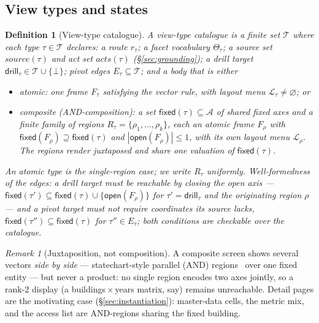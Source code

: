 \documentclass[11pt,a4paper]{article}
\newtheorem{definition}{Definition}[section]
\theoremstyle{remark}
\newtheorem{remark}{Remark}[section]
\newcommand{\Ax}{\mathcal{A}}                    %
\newcommand{\open}{\mathsf{open}}
\newcommand{\fixed}{\mathsf{fixed}}
\newcommand{\vdrill}{\mathsf{drill}}
\newcommand{\TT}{\mathcal{T}}                    %
\newcommand{\LL}{\mathcal{L}}
\newcommand{\src}{\mathit{source}}
\newcommand{\acts}{\mathit{acts}}
\begin{document}
\subsection{View types and states}

\begin{definition}[View-type catalogue]\label{def:catalogue}
A \emph{view-type catalogue} is a finite set $\TT$ where each type $\tau \in \TT$
declares: a route $r_\tau$; a facet vocabulary $\Theta_\tau$; a source set
$\src(\tau)$ and act set $\acts(\tau)$ (\S\ref{sec:grounding}); a drill target
$\vdrill_\tau \in \TT \cup \{\bot\}$; pivot edges $E_\tau \subseteq \TT$; and a
body that is either
\begin{itemize}
\item \emph{atomic}: one frame $F_\tau$ satisfying the vector rule, with layout
  menu $\LL_\tau \neq \varnothing$; or
\item \emph{composite} (AND-composition): a set $\fixed(\tau) \subseteq \Ax$ of
  shared fixed axes and a finite family of \emph{regions}
  $R_\tau = \{\rho_1, \ldots, \rho_k\}$, each an atomic frame $F_\rho$ with
  $\fixed(F_\rho) \supseteq \fixed(\tau)$ and $|\open(F_\rho)| \le 1$, with its
  own layout menu $\LL_\rho$. The regions render \emph{juxtaposed} and share one
  valuation of $\fixed(\tau)$.
\end{itemize}
An atomic type is the single-region case; we write $R_\tau$ uniformly.
Well-formedness of the edges: a drill target must be reachable by closing the
open axis --- $\fixed(\tau') \subseteq \fixed(\tau) \cup \{\open(F_\rho)\}$
for $\tau' = \vdrill_\tau$ and the originating region $\rho$ --- and a pivot
target must not require coordinates its source lacks,
$\fixed(\tau'') \subseteq \fixed(\tau)$ for $\tau'' \in E_\tau$; both
conditions are checkable over the catalogue.
\end{definition}

\begin{remark}[Juxtaposition, not composition]\label{rem:juxta}
A composite screen shows several vectors \emph{side by side} --- statechart-style
parallel (AND) regions~\cite{harel} over one fixed entity --- but never a
product: no single region encodes two axes jointly, so a rank-$2$ display (a
buildings\,$\times$\,years matrix, say) remains unreachable. Detail pages are
the motivating case (\S\ref{sec:instantiation}): master-data cells, the metric
mix, and the access list are AND-regions sharing the fixed building.
\end{remark}
\end{document}
